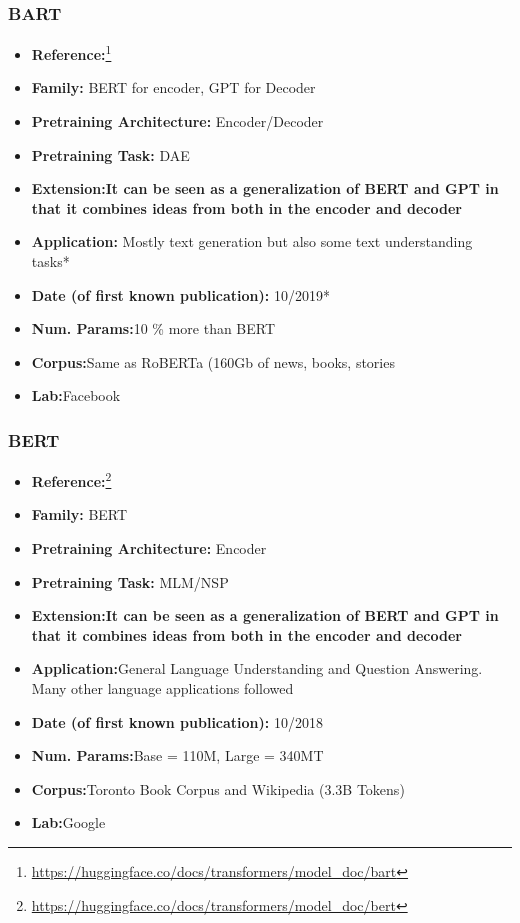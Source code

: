 \documentclass{article}
\begin{document}
\subsubsection{BART}
            \begin{itemize}
                \item \textbf{Reference:}\footnote{\url{https://huggingface.co/docs/transformers/model_doc/bart}}\cite{lewis2019bart}
                \item \textbf{Family:} BERT for encoder, GPT for Decoder 
                \item \textbf{Pretraining Architecture:} Encoder/Decoder
                \item \textbf{Pretraining Task:} DAE
                \item \textbf{Extension:It can be seen as a generalization of BERT and GPT in that it combines ideas from both in the encoder and decoder}   
                \item \textbf{Application:} Mostly text generation but also some text understanding tasks*
                \item \textbf{Date (of first known publication):} 10/2019*
                \item \textbf{Num. Params:}10 \% more than BERT
                \item \textbf{Corpus:}Same as RoBERTa (160Gb of news, books, stories
                \item \textbf{Lab:}Facebook
            \end{itemize}

\subsubsection{BERT}

            \begin{itemize}
                \item \textbf{Reference:}\footnote{\url{https://huggingface.co/docs/transformers/model_doc/bert}}\cite{devlin2018bert}
                \item \textbf{Family:} BERT 
                \item \textbf{Pretraining Architecture:} Encoder
                \item \textbf{Pretraining Task:} MLM/NSP
                \item \textbf{Extension:It can be seen as a generalization of BERT and GPT in that it combines ideas from both in the encoder and decoder}   
                \item \textbf{Application:}General Language Understanding and Question Answering. Many other language applications followed
                \item \textbf{Date (of first known publication):} 10/2018
                \item \textbf{Num. Params:}Base = 110M, Large = 340MT
                \item \textbf{Corpus:}Toronto Book Corpus and Wikipedia (3.3B Tokens)
                \item \textbf{Lab:}Google
            \end{itemize}
\end{document}
